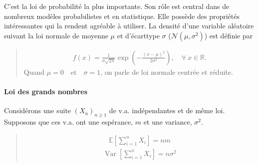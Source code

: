\documentclass[letterpaper,11pt,english]{sphinxmanual}
\begin{document}
\begin{DUlineblock}{0em}
\item[]  
\item[] C’est la loi de probabilité la plus importante. Son rôle est central
dans de nombreux modèles probabilistes et en statistique. Elle possède
des propriétés intéressantes qui la rendent agréable à utiliser. La
densité d’une variable aléatoire suivant la loi normale de moyenne
\(\mu\) et d’écart\sphinxhyphen{}type \(\sigma\)
(\(\mathcal{N}(\mu,\sigma^2)\)) est définie par
\end{DUlineblock}
\begin{quote}
\begin{equation}\label{equation:chapter2:chapter2:50}
\begin{split}f(x) = \frac{1}{\sigma\sqrt{2\pi}}\exp\left(-\frac{(x-\mu)^2}{2\sigma^2}\right), \quad \forall\  x \in \mathbb{R}.\end{split}
\end{equation}
\sphinxAtStartPar
Quand \(\mu=0 \quad \text{et} \quad \sigma = 1\), on parle de loi
normale centrée et réduite.
\end{quote}


\paragraph{Loi des grands nombres}
\label{\detokenize{chapter2:loi-des-grands-nombres}}
\sphinxAtStartPar
Considérons une suite \(\left(X_{n}\right)_{n \geq 1}\) de v.a.
indépendantes et de même loi. Supposons que ces v.a. ont une espérance,
\(m\) et une variance, \(\sigma^{2}\).

\begin{DUlineblock}{0em}
\item[] 
\item[] 
\end{DUlineblock}
\begin{quote}
\begin{equation}\label{equation:chapter2:chapter2:51}
\begin{split}\mathbb{E}\left[\sum_{i=1}^{n} X_i\right] = nm\end{split}
\end{equation}\begin{equation}\label{equation:chapter2:chapter2:52}
\begin{split}\operatorname{Var}\left[\sum_{i=1}^{n} X_i\right] = n\sigma^2\end{split}
\end{equation}\end{quote}
\end{document}
